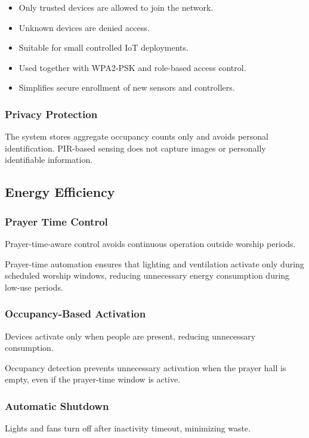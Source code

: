 \begin{itemize}
  \item Only trusted devices are allowed to join the network.
  \item Unknown devices are denied access.
  \item Suitable for small controlled IoT deployments.
  \item Used together with WPA2-PSK and role-based access control.
  \item Simplifies secure enrollment of new sensors and controllers.
\end{itemize}

\subsubsection{Privacy Protection}
The system stores aggregate occupancy counts only and avoids personal identification. PIR-based sensing does not capture images or personally identifiable information.

\subsection{Energy Efficiency}

\subsubsection{Prayer Time Control}
Prayer-time-aware control avoids continuous operation outside worship periods.

Prayer-time automation ensures that lighting and ventilation activate only during scheduled worship windows, reducing unnecessary energy consumption during low-use periods.

\subsubsection{Occupancy-Based Activation}
Devices activate only when people are present, reducing unnecessary consumption.

Occupancy detection prevents unnecessary activation when the prayer hall is empty, even if the prayer-time window is active.

\subsubsection{Automatic Shutdown}
Lights and fans turn off after inactivity timeout, minimizing waste.

